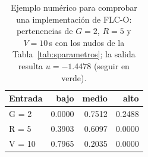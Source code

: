 \begin{table}[t]
\centering
\caption{Ejemplo num\'erico para comprobar una implementaci\'on de FLC-O: pertenencias de $G=2$, $R=5$ y $V=10$\,s con los nudos de la Tabla~\ref{tab:sparametros}; la salida resulta $u=-1.4478$ (seguir en verde).}
\label{tab:sejemplo}
\scriptsize
\begin{tabular}{@{}lrrr@{}}
\toprule
Entrada & bajo & medio & alto \\
\midrule
G = 2 & 0.0000 & 0.7512 & 0.2488 \\
R = 5 & 0.3903 & 0.6097 & 0.0000 \\
V = 10 & 0.7965 & 0.2035 & 0.0000 \\
\bottomrule
\end{tabular}
\end{table}
